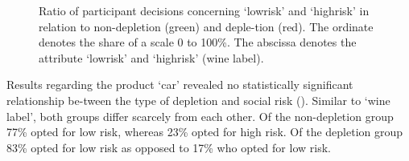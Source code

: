 \begin{figure}[!h]
\begin{floatrow}
{\begin{tikzpicture}[text depth=3pt]
		\end{tikzpicture}
}{%
  \caption{Ratio of participant decisions concerning ‘lowrisk’ and ‘highrisk’ in relation to non-depletion (green) and deple-tion (red). The ordinate denotes the share of a scale 0 to 100\%. The abscissa denotes the attribute ‘lowrisk’ and ‘highrisk’ (wine label).}\label{fig:chart_wine}%
}
\end{floatrow}
\end{figure}
Results regarding the product ‘car’ revealed no statistically significant relationship be-tween the type of depletion and social risk (). Similar to ‘wine label’, both groups differ scarcely from each other. Of the non-depletion group 77\% opted for low risk, whereas 23\% opted for high risk. Of the depletion group 83\% opted for low risk as opposed to 17\% who opted for low risk. 

